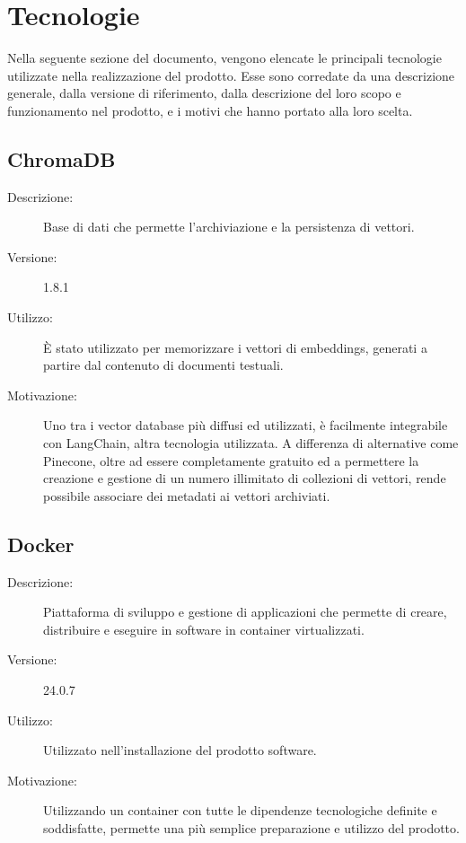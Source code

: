 \chapter{Tecnologie} \label{cap:tech}
Nella seguente sezione del documento, vengono elencate le principali tecnologie utilizzate nella realizzazione del prodotto. Esse sono corredate da una descrizione generale, dalla versione di riferimento, dalla descrizione del loro scopo e funzionamento nel prodotto, e i motivi che hanno portato alla loro scelta.

\section{ChromaDB}
\begin{description}
\item[Descrizione:] Base di dati che permette l'archiviazione e la persistenza di vettori.
\item[Versione:] 1.8.1
\item[Utilizzo:] È stato utilizzato per memorizzare i vettori di embeddings, generati a partire dal contenuto di documenti testuali.
\item[Motivazione:] Uno tra i vector database più diffusi ed utilizzati, è facilmente integrabile con LangChain, altra tecnologia utilizzata. A differenza di alternative come Pinecone, oltre ad essere completamente gratuito ed a permettere la creazione e gestione di un numero illimitato di collezioni di vettori, rende possibile associare dei metadati ai vettori archiviati.
\end{description}

\section{Docker}
\begin{description}
\item[Descrizione:] Piattaforma di sviluppo e gestione di applicazioni che permette di creare, distribuire e eseguire in  software in container virtualizzati.
\item[Versione:] 24.0.7
\item[Utilizzo:] Utilizzato nell'installazione del prodotto software.
\item[Motivazione:] Utilizzando un container con tutte le dipendenze tecnologiche definite e soddisfatte, permette una più semplice preparazione e utilizzo del prodotto.
\end{description}

